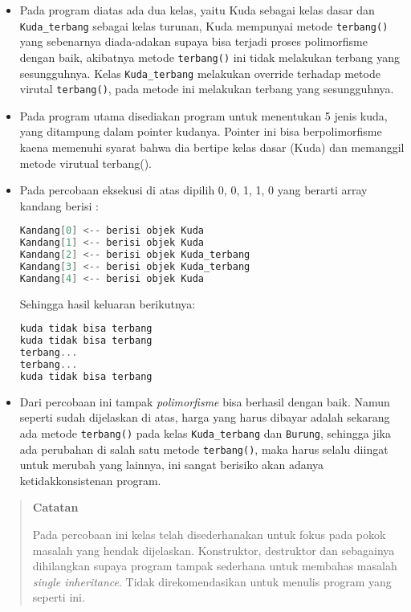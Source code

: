 \begin{itemize}
\item
  Pada program diatas ada dua kelas, yaitu Kuda sebagai kelas dasar dan
  \texttt{Kuda\_terbang} sebagai kelas turunan, Kuda mempunyai metode
  \texttt{terbang()} yang sebenarnya diada-adakan supaya bisa terjadi
  proses polimorfisme dengan baik, akibatnya metode \texttt{terbang()}
  ini tidak melakukan terbang yang sesungguhnya. Kelas
  \texttt{Kuda\_terbang} melakukan override terhadap metode virutal
  \texttt{terbang()}, pada metode ini melakukan terbang yang
  sesungguhnya.
\item
  Pada program utama disediakan program untuk menentukan 5 jenis kuda,
  yang ditampung dalam pointer kudanya. Pointer ini bisa berpolimorfisme
  kaena memenuhi syarat bahwa dia bertipe kelas dasar (Kuda) dan
  memanggil metode virutual terbang().
\item
  Pada percobaan eksekusi di atas dipilih 0, 0, 1, 1, 0 yang berarti
  array kandang berisi :

\begin{lstlisting}[language=c++, numbers=none]
Kandang[0] <-- berisi objek Kuda 
Kandang[1] <-- berisi objek Kuda 
Kandang[2] <-- berisi objek Kuda_terbang 
Kandang[3] <-- berisi objek Kuda_terbang 
Kandang[4] <-- berisi objek Kuda 
\end{lstlisting}

  Sehingga hasil keluaran berikutnya:

\begin{lstlisting}[language=c++, numbers=none]
kuda tidak bisa terbang 
kuda tidak bisa terbang 
terbang... 
terbang... 
kuda tidak bisa terbang
\end{lstlisting}
\item
  Dari percobaan ini tampak \emph{polimorfisme} bisa berhasil dengan
  baik. Namun seperti sudah dijelaskan di atas, harga yang harus dibayar
  adalah sekarang ada metode \texttt{terbang()} pada kelas
  \texttt{Kuda\_terbang} dan \texttt{Burung}, sehingga jika ada
  perubahan di salah satu metode \texttt{terbang()}, maka harus selalu
  diingat untuk merubah yang lainnya, ini sangat berisiko akan adanya
  ketidakkonsistenan program.
\end{itemize}
\begin{quotation}
 {\LARGE {}} 	\textbf{Catatan}
	
	Pada	percobaan ini kelas telah disederhanakan untuk fokus pada pokok masalah
	yang hendak dijelaskan. Konstruktor, destruktor dan sebagainya
	dihilangkan supaya program tampak sederhana untuk membahas masalah
	\emph{single inheritance}. Tidak direkomendasikan untuk menulis program
	yang seperti ini.
\end{quotation}



